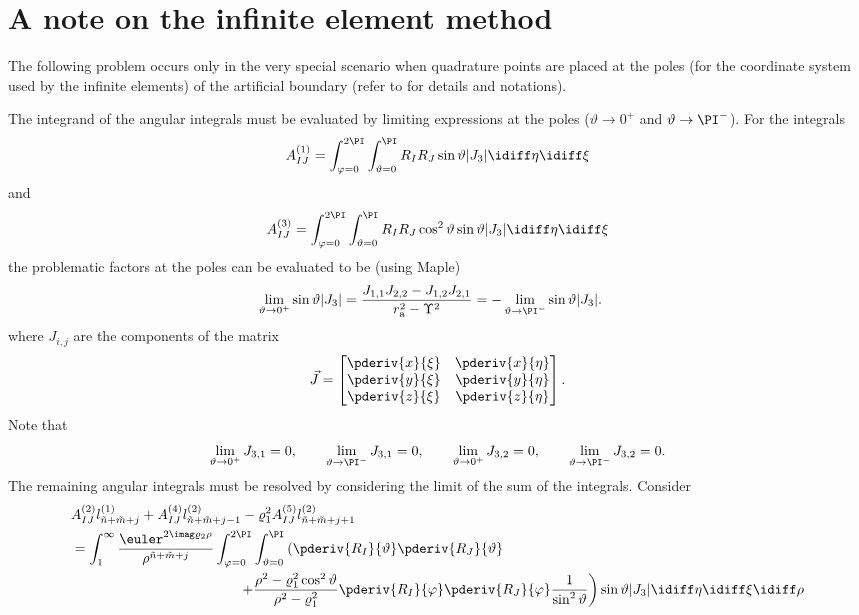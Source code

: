 \section{A note on the infinite element method}
\label{Sec:evaluationOfIEintegrals}
The following problem occurs only in the very special scenario when quadrature points are placed at the poles (for the coordinate system used by the infinite elements) of the artificial boundary (refer to \cite{Venas2018iao} for details and notations).

The integrand of the angular integrals \cite[Eq. (A.18)]{Venas2018iao} must be evaluated by limiting expressions at the poles ($\vartheta\to 0^+$ and $\vartheta\to \PI^-$). For the integrals
\begin{equation*}
	A_{IJ}^{(1)} = \int_{\varphi=0}^{2\PI}\int_{\vartheta=0}^\PI R_IR_J\sin\vartheta|J_3|\idiff\eta\idiff\xi
\end{equation*}
and
\begin{equation*}
	A_{IJ}^{(3)} = \int_{\varphi=0}^{2\PI}\int_{\vartheta=0}^\PI R_IR_J\cos^2\vartheta\sin\vartheta|J_3|\idiff\eta\idiff\xi
\end{equation*}
the problematic factors at the poles can be evaluated to be (using Maple)
\begin{align*}
	\lim_{\vartheta\to 0^+}\sin\vartheta|J_3| &= \frac{J_{1,1}J_{2,2}-J_{1,2}J_{2,1}}{r_{\mathrm{a}}^2-\Upsilon^2}= -\lim_{\vartheta\to \PI^-}\sin\vartheta|J_3|.
\end{align*}
where $J_{i,j}$ are the components of the matrix
\begin{equation*}
	\vec{J} = \begin{bmatrix}
		\pderiv{x}{\xi} & \pderiv{x}{\eta}\\
		\pderiv{y}{\xi} & \pderiv{y}{\eta}\\
		\pderiv{z}{\xi} & \pderiv{z}{\eta}
	\end{bmatrix}.
\end{equation*}
Note that
\begin{equation*}
	\lim_{\vartheta\to 0^+}J_{3,1} = 0,\qquad\lim_{\vartheta\to \PI^-}J_{3,1} = 0,\qquad\lim_{\vartheta\to 0^+}J_{3,2} = 0,\qquad\lim_{\vartheta\to \PI^-}J_{3,2} = 0.
\end{equation*}
The remaining angular integrals must be resolved by considering the limit of the sum of the integrals. Consider
\begin{align*}
	&A_{IJ}^{(2)}l_{\tilde{n}+\tilde{m}+j}^{(1)}+A_{IJ}^{(4)}l_{\tilde{n}+\tilde{m}+j-1}^{(2)}-\varrho_1^2 A_{IJ}^{(5)}l_{\tilde{n}+\tilde{m}+j+1}^{(2)}\\
	&= \int_1^\infty \frac{\euler^{2\imag \varrho_2\rho}}{\rho^{\tilde{n}+\tilde{m}+j}}\int_{\varphi=0}^{2\PI}\int_{\vartheta=0}^\PI \left(\pderiv{R_I}{\vartheta} \pderiv{R_J}{\vartheta}\right.\\
	&{\hskip12em\relax}\left.+ \frac{\rho^2-\varrho_1^2\cos^2\vartheta}{\rho^2-\varrho_1^2}\pderiv{R_I}{\varphi} \pderiv{R_J}{\varphi}\frac{1}{\sin^2\vartheta}\right)\sin\vartheta|J_3|\idiff\eta\idiff\xi\idiff\rho
\end{align*}
